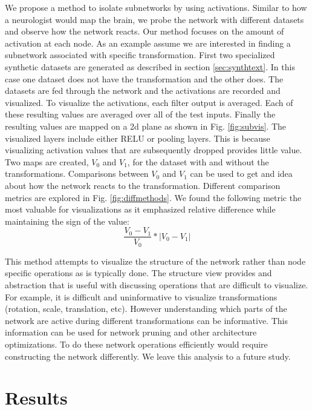 \documentclass[10pt,twocolumn,letterpaper]{article}
\begin{document}
We propose a method to isolate subnetworks by using activations. Similar to how a neurologist would map the brain, we probe the network with different datasets and observe how the network reacts. Our method focuses on the amount of activation at each node. As an example assume we are interested in finding a subnetwork associated with specific transformation. First two specialized synthetic datasets are generated as described in section \ref{sec:synthtext}. In this case one dataset does not have the transformation and the other does. The datasets are fed through the network and the activations are recorded and visualized. To visualize the activations, each filter output is averaged. Each of these resulting values are averaged over all of the test inputs. Finally the resulting values are mapped on a 2d plane as shown in Fig. \ref{fig:subvis}. The visualized layers include either RELU or pooling layers. This is because visualizing activation values that are subsequently dropped provides little value. Two maps are created, $V_0$ and $V_1$, for the dataset with and without the transformations. Comparisons between $V_0$ and $V_1$ can be used to get and idea about how the network reacts to the transformation. Different comparison metrics are explored in Fig. \ref{fig:diffmethods}. We found the following metric the most valuable for visualizations as it emphasized relative difference while maintaining the sign of the value:
\begin{equation} \label{eq:1}
\frac{V_0-V_1}{V_0} * |V_0-V_1|
\end{equation}


This method attempts to visualize the structure of the network rather than node specific operations as is typically done. The structure view provides and abstraction that is useful with discussing operations that are difficult to visualize. For example, it is difficult and uninformative to visualize transformations (rotation, scale, translation, etc). However understanding which parts of the network are active during different transformations can be informative. This information can be used for network pruning and other architecture optimizations. To do these network operations efficiently would require constructing the network differently. We leave this analysis to a future study.

\section{Results}
\end{document}
